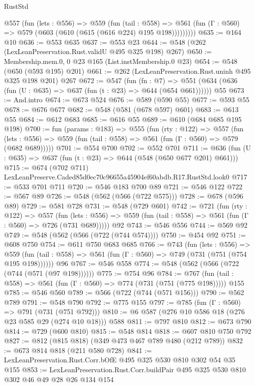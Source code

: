 \begin{lexlean}{RustStd}
\begin{coremodule}
        @557
          (fun (lets : @556) =>
          @559
            (fun (tail : @558) =>
            @561 (fun (Γ : @560) => @579 (@603 (@610 (@615 (@616 @224) @195 @198)))))))))
@635 := @164 @10
@636 := @553 @635
@637 := @553 @23
@644 := @548 (@262 (LexLeanPreservation.Rust.validU @495 @325 @198) @267)
@650 := Membership.mem.{0, 0} @23 @165 (List.instMembership.{0} @23)
@654 := @548 (@650 (@593 @195) @201)
@661 := @262 (LexLeanPreservation.Rust.uninh @495 @325 @198 @201) @267
@672 := @547
    (fun (fn : @7) =>
    @551 (@634 (@636 (fun (U : @635) => @637 (fun (t : @23) => @644 (@654 @661))))))
    @55
@673 := And.intro
@674 := @673 @524
@676 := @589 (@590 @55)
@677 := @593 @55
@678 := @676 @677
@682 := @548 (@581 (@678 @597) @601)
@683 := @613 @55
@684 := @612 @683
@685 := @616 @55
@689 := @610 (@684 @685 @195 @198)
@700 := fun (params : @183) =>
  @555
    (fun (rty : @122) =>
    @557
      (fun (lets : @556) => @559 (fun (tail : @558) => @561 (fun (Γ : @560) => @579 (@682 @689)))))
@701 := @554 @700
@702 := @552 @701
@711 := @636 (fun (U : @635) => @637 (fun (t : @23) => @644 (@548 (@650 @677 @201) @661)))
@715 := @674 (@702 @711) LexLeanPreserve.Caded85d0ec70c96655a45904ef60abdb.R17.RustStd.look0
@717 := @533 @701 @711
@720 := @546 @183 @700 @89
@721 := @546 @122
@722 := @567 @89
@726 := @548 (@562 (@566 (@722 @575)))
@728 := @678 (@596 @89)
@729 := @581 @728
@731 := @548 (@729 @601)
@742 := @721
    (fun (rty : @122) =>
    @557
      (fun (lets : @556) => @559 (fun (tail : @558) => @561 (fun (Γ : @560) => @726 (@731 @689)))))
    @92
@743 := @546 @556
@744 := @569 @92
@749 := @548 (@562 (@566 (@722 (@744 @574))))
@750 := @454 @92
@751 := @608 @750
@754 := @611 @750 @683 @685
@766 := @743
    (fun (lets : @556) =>
    @559 (fun (tail : @558) => @561 (fun (Γ : @560) => @749 (@731 (@751 (@754 @195 @198))))))
    @96
@767 := @546 @558
@774 := @548 (@562 (@566 (@722 (@744 (@571 (@97 @198))))))
@775 := @754 @96
@784 := @767 (fun (tail : @558) => @561 (fun (Γ : @560) => @774 (@731 (@751 (@775 @198))))) @155
@785 := @546 @560
@789 := @566 (@722 (@744 (@571 @156)))
@790 := @562 @789
@791 := @548 @790
@792 := @775 @155
@797 := @785 (fun (Γ : @560) => @791 (@731 (@751 @792)))
@810 := @6 @587 (@276 @10 @586 @18 (@276 @23 @585 @29 (@274 @10 @18))) @588
@811 := @797 @810
@812 := @673 @790
@814 := @729 (@600 @810)
@815 := @548 @814
@818 := @607 @810 @750 @792
@827 := @812 (@815 @818) (@349 @473 @467 @789 @480 (@212 @789))
@832 := @673 @814 @818 (@211 @580 @728)
@841 := LexLeanPreservation.Rust.Corr.bOfE @495 @325 @530 @810 @302 @54 @35 @155
@853 := LexLeanPreservation.Rust.Corr.buildPair @495 @325 @530 @810 @302 @46 @49 @28 @26 @134 @154

\end{coremodule}
\end{lexlean}
